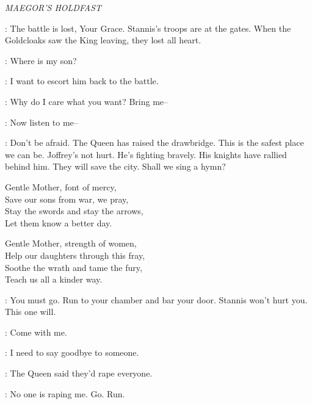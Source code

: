 

\scene

\textit{MAEGOR'S HOLDFAST}


\LANCEL: The battle is lost, Your Grace. Stannis's troops are at the gates. When the Goldcloaks saw the King leaving, they lost all heart. 

\CERSEI: Where is my son? 

\LANCEL: I want to escort him back to the battle. 

\CERSEI: Why do I care what you want? Bring me--

\LANCEL: Now listen to me-- 


\SANSA:  Don't be afraid. The Queen has raised the drawbridge. This is the safest place we can be. Joffrey's not hurt. He's fighting bravely. His knights have rallied behind him. They will save the city. Shall we sing a hymn? 


Gentle Mother, font of mercy,\\
Save our sons from war, we pray,\\
Stay the swords and stay the arrows,\\
Let them know a better day.

Gentle Mother, strength of women,\\
Help our daughters through this fray,\\
Soothe the wrath and tame the fury,\\
Teach us all a kinder way.

\SHAE:  You must go. Run to your chamber and bar your door. Stannis won't hurt you.  This one will. 

\SANSA: Come with me. 

\SHAE: I need to say goodbye to someone. 

\SANSA: The Queen said they'd rape everyone. 

\SHAE:  No one is raping me. Go. Run. 


